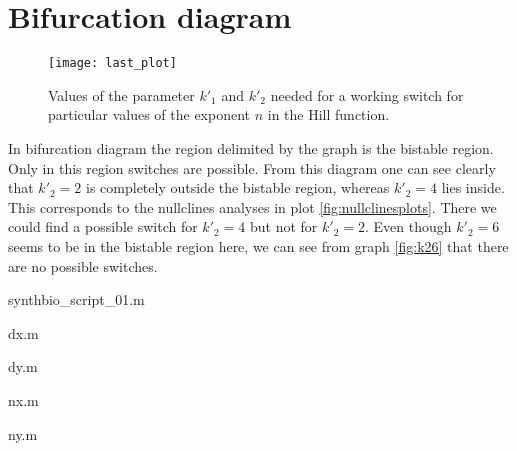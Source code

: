 \section{Bifurcation diagram}


\begin{figure}[h]
 \centering
    \texttt{[image: last\_plot]}
    \caption{Values of the parameter $k'_1$ and $k'_2$ needed for a working
    switch for particular values of the exponent $n$ in the Hill function.}
	\label{fig:bifurcatingplot}
\end{figure}

 In bifurcation diagram the region delimited by the graph is the bistable
 region. Only in this region switches are possible. From this diagram one can
 see clearly that $k'_2 = 2$ is completely outside the bistable region,
 whereas $k'_2 = 4$ lies inside. This corresponds to the nullclines analyses in
 plot \ref{fig:nullclinesplots}. There we could find a possible switch for $k'_2=4$ but not
 for $k'_2 = 2$. Even though $k'_2 = 6$ seems to be in the bistable region here,
 we can see from graph \ref{fig:k26} that there are no possible switches.

\newpage


\begin{section}{synthbio\_script\_01.m}

\end{section}
\begin{section}{dx.m}

\end{section}
\begin{section}{dy.m}

\end{section}
\begin{section}{nx.m}

\end{section}
\begin{section}{ny.m}

\end{section}
